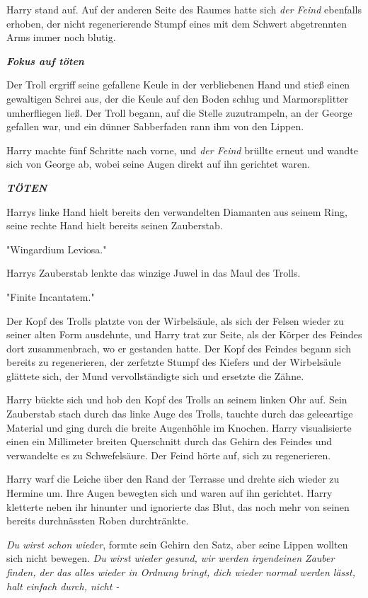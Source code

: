 {Harry stand auf. Auf der anderen Seite des Raumes hatte sich \emph{der Feind} ebenfalls erhoben, der nicht regenerierende Stumpf eines mit dem Schwert abgetrennten Arms immer noch blutig.

\textbf{\emph{Fokus auf töten}}

Der Troll ergriff seine gefallene Keule in der verbliebenen Hand und stieß einen gewaltigen Schrei aus, der die Keule auf den Boden schlug und Marmorsplitter umherfliegen ließ. Der Troll begann, auf die Stelle zuzutrampeln, an der George gefallen war, und ein dünner Sabberfaden rann ihm von den Lippen.

Harry machte fünf Schritte nach vorne, und \emph{der Feind} brüllte erneut und wandte sich von George ab, wobei seine Augen direkt auf ihn gerichtet waren.

\textbf{\emph{TÖTEN}}

Harrys linke Hand hielt bereits den verwandelten Diamanten aus seinem Ring, seine rechte Hand hielt bereits seinen Zauberstab.

"Wingardium Leviosa."

Harrys Zauberstab lenkte das winzige Juwel in das Maul des Trolls.

"Finite Incantatem."

Der Kopf des Trolls platzte von der Wirbelsäule, als sich der Felsen wieder zu seiner alten Form ausdehnte, und Harry trat zur Seite, als der Körper des Feindes dort zusammenbrach, wo er gestanden hatte. Der Kopf des Feindes begann sich bereits zu regenerieren, der zerfetzte Stumpf des Kiefers und der Wirbelsäule glättete sich, der Mund vervollständigte sich und ersetzte die Zähne.

Harry bückte sich und hob den Kopf des Trolls an seinem linken Ohr auf. Sein Zauberstab stach durch das linke Auge des Trolls, tauchte durch das geleeartige Material und ging durch die breite Augenhöhle im Knochen. Harry visualisierte einen ein Millimeter breiten Querschnitt durch das Gehirn des Feindes und verwandelte es zu Schwefelsäure. Der Feind hörte auf, sich zu regenerieren.

Harry warf die Leiche über den Rand der Terrasse und drehte sich wieder zu Hermine um. Ihre Augen bewegten sich und waren auf ihn gerichtet. Harry kletterte neben ihr hinunter und ignorierte das Blut, das noch mehr von seinen bereits durchnässten Roben durchtränkte.

\emph{Du wirst schon wieder}, formte sein Gehirn den Satz, aber seine Lippen wollten sich nicht bewegen. \emph{Du wirst wieder gesund, wir werden irgendeinen Zauber finden, der das alles wieder in Ordnung bringt, dich wieder normal werden lässt, halt einfach durch, nicht -}

}
